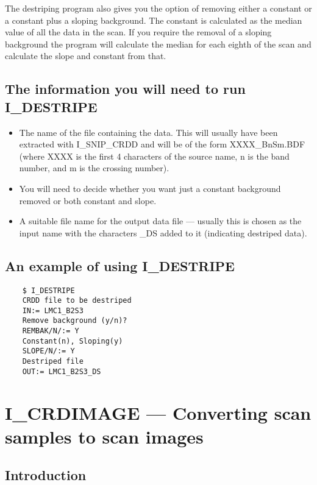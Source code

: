 The destriping program also gives you the option of removing either a constant 
or a constant plus a sloping background. The constant is calculated as the 
median value of all the data in the scan. If you require the removal of a 
sloping background the program will calculate the median for each eighth of the
scan and calculate the slope and constant from that.

\subsection {The information you will need to run I\_DESTRIPE}

\begin {itemize}

\item The name of the file containing the data. This will usually have been
extracted with I\_SNIP\_CRDD and will be of the form XXXX\_BnSm.BDF
(where XXXX is the first 4 characters of the source name, n is the band
number, and m is the crossing number).

\item You will need to decide whether you want just a constant background
removed or both constant and slope.

\item A suitable file name for the output data file --- usually this is chosen
as the input name with the characters \_DS added to it (indicating 
destriped data).
\end {itemize}

\subsection {An example of using I\_DESTRIPE}

\begin {verbatim}
    $ I_DESTRIPE
    CRDD file to be destriped
    IN:= LMC1_B2S3
    Remove background (y/n)?
    REMBAK/N/:= Y
    Constant(n), Sloping(y)
    SLOPE/N/:= Y
    Destriped file
    OUT:= LMC1_B2S3_DS
\end{verbatim}
\pagebreak

\section{I\_CRDIMAGE --- Converting scan samples to scan images}

\subsection{Introduction}

